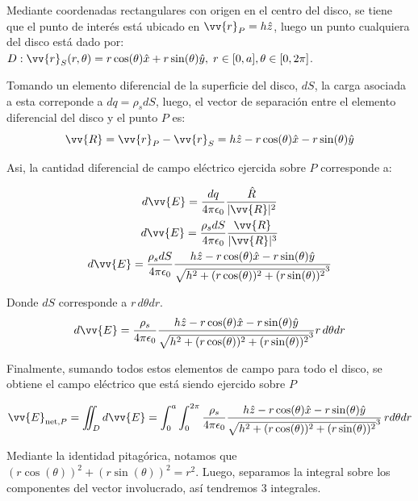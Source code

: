 \documentclass[11pt]{article}
\begin{document}
\begin{solucion}

    Mediante coordenadas rectangulares con origen en el centro del disco, se tiene que el punto de interés está ubicado en $\vv{r}_P= h\hat{z}$, luego un punto cualquiera del disco está dado por: $D: \vv{r}_S(r, \theta) = r\cos(\theta)\hat{x} + r\sin(\theta)\hat{y}, \; r\in[0, a], \theta\in[0, 2\pi]$.

    Tomando un elemento diferencial de la superficie del disco, $dS$, la carga asociada a esta correponde a $dq = \rho_s dS$, luego, el vector de separación entre el elemento diferencial del disco y el punto $P$ es:
    \begin{equation}
        \vv{R} = \vv{r}_P - \vv{r}_S = h\hat{z} - r\cos(\theta)\hat{x} - r\sin(\theta)\hat{y}
    \end{equation}

    Asi, la cantidad diferencial de campo eléctrico ejercida sobre $P$ corresponde a:

    \begin{gather}
        d\vv{E}  = \frac{dq}{4\pi\epsilon_0}\frac{\hat{R}}{|\vv{R}|^2}
        \\
        d\vv{E}  = \frac{\rho_s dS}{4\pi\epsilon_0}\frac{\vv{R}}{|\vv{R}|^3}
        \\
        d\vv{E}  = \frac{\rho_s dS}{4\pi\epsilon_0}\frac{h\hat{z} - r\cos(\theta)\hat{x} - r\sin(\theta)\hat{y}}{\sqrt{h^2+ (r\cos(\theta))^2 + (r\sin(\theta))^2}^3}
    \end{gather}

    Donde $dS$ corresponde a $r\,d\theta dr$.
    \begin{equation}
        d\vv{E}  = \frac{\rho_s}{4\pi\epsilon_0}\frac{h\hat{z} - r\cos(\theta)\hat{x} - r\sin(\theta)\hat{y}}{\sqrt{h^2+ (r\cos(\theta))^2 + (r\sin(\theta))^2}^3}r\,d\theta dr
    \end{equation}

    Finalmente, sumando todos estos elementos de campo para todo el disco, se obtiene el campo eléctrico que está siendo ejercido sobre $P$

    \begin{equation}
        \vv{E}_{\text{net}, P} = \iint_D d\vv{E} = \int_{0}^{a}\int_{0}^{2\pi} \frac{\rho_s}{4\pi\epsilon_0}\frac{h\hat{z} - r\cos(\theta)\hat{x} - r\sin(\theta)\hat{y}}{\sqrt{h^2+ (r\cos(\theta))^2 + (r\sin(\theta))^2}^3}\,rd\theta dr
    \end{equation}

    Mediante la identidad pitagórica, notamos que $(r\cos(\theta))^2 + (r\sin(\theta))^2 = r^2$. Luego, separamos la integral sobre los componentes del vector involucrado, así tendremos 3 integrales.


\end{solucion}
\end{document}
